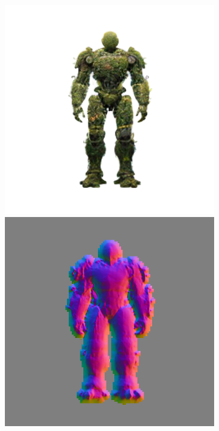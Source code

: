 \begin{figure}[H]
\begin{subfigure}[b]{0.18\textwidth}
        \caption{}
    \end{subfigure}
    \begin{subfigure}[b]{0.18\textwidth}
        \centering
        \fontsize{9pt}{7pt}\selectfont{}
        \includegraphics[width=\textwidth]{etc/a robot made out of plants/wonder3d/test/wonder3D_9000_front_part1}
        \includegraphics[width=\textwidth]{etc/a robot made out of plants/wonder3d/test/wonder3D_9000_front_part4}

\end{subfigure}
\end{figure}

